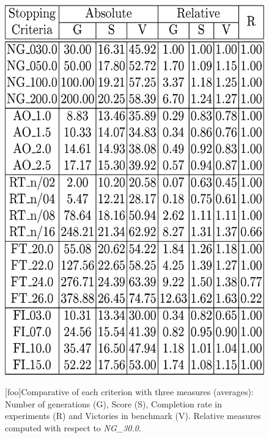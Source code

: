 \documentclass[runningheads,a4paper]{llncs}
\begin{document}
\begin{figure}[h!tb]
\begin{minipage}[b]{.44\columnwidth}
\includegraphics[width=1\columnwidth]{imags/tabla.eps}

[foo]{Comparative of each criterion with three measures (averages): Number of generations (G), Score (S), Completion rate in experiments (R) and  Victories in benchmark (V). Relative measures computed with respect to \textit{NG\_30.0}.}
\label{fig:table}
\end{minipage}
\end{figure}

\end{document}

